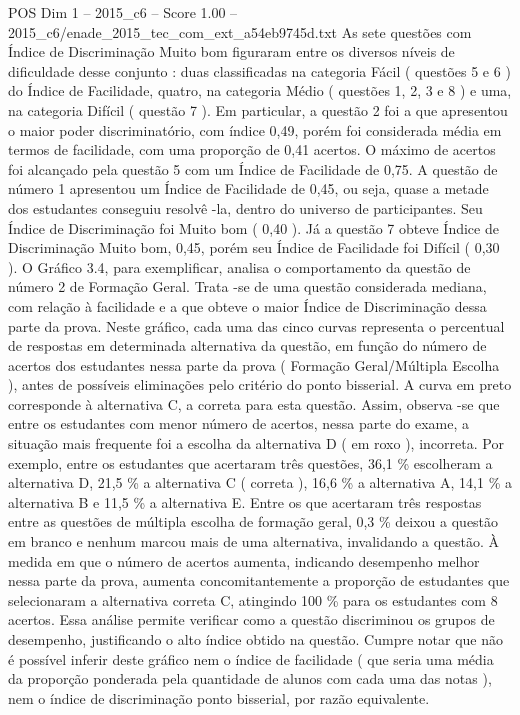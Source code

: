 \begin{textsample}{POS Dim 1 – 2015\_c6 – Score 1.00 – 2015\_c6/enade\_2015\_tec\_com\_ext\_a54eb9745d.txt}
As sete questões com Índice de Discriminação Muito bom figuraram entre os diversos níveis de dificuldade desse conjunto : duas classificadas na categoria Fácil ( questões 5 e 6 ) do Índice de Facilidade, quatro, na categoria Médio ( questões 1, 2, 3 e 8 ) e uma, na categoria Difícil ( questão 7 ).
Em particular, a questão 2 foi a que apresentou o maior poder discriminatório, com índice 0,49, porém foi considerada média em termos de facilidade, com uma proporção de 0,41 acertos.
O máximo de acertos foi alcançado pela questão 5 com um Índice de Facilidade de 0,75.
A questão de número 1 apresentou um Índice de Facilidade de 0,45, ou seja, quase a metade dos estudantes conseguiu resolvê -la, dentro do universo de participantes.
Seu Índice de Discriminação foi Muito bom ( 0,40 ).
Já a questão 7 obteve Índice de Discriminação Muito bom, 0,45, porém seu Índice de Facilidade foi Difícil ( 0,30 ).
O Gráfico 3.4, para exemplificar, analisa o comportamento da questão de número 2 de Formação Geral.
Trata -se de uma questão considerada mediana, com relação à facilidade e a que obteve o maior Índice de Discriminação dessa parte da prova.
Neste gráfico, cada uma das cinco curvas representa o percentual de respostas em determinada alternativa da questão, em função do número de acertos dos estudantes nessa parte da prova ( Formação Geral/Múltipla Escolha ), antes de possíveis eliminações pelo critério do ponto bisserial.
A curva em preto corresponde à alternativa C, a correta para esta questão.
Assim, observa -se que entre os estudantes com menor número de acertos, nessa parte do exame, a situação mais frequente foi a escolha da alternativa D ( em roxo ), incorreta.
Por exemplo, entre os estudantes que acertaram três questões, 36,1 \% escolheram a alternativa D, 21,5 \% a alternativa C ( correta ), 16,6 \% a alternativa A, 14,1 \% a alternativa B e 11,5 \% a alternativa E.
Entre os que acertaram três respostas entre as questões de múltipla escolha de formação geral, 0,3 \% deixou a questão em branco e nenhum marcou mais de uma alternativa, invalidando a questão.
À medida em que o número de acertos aumenta, indicando desempenho melhor nessa parte da prova, aumenta concomitantemente a proporção de estudantes que selecionaram a alternativa correta C, atingindo 100 \% para os estudantes com 8 acertos.
Essa análise permite verificar como a questão discriminou os grupos de desempenho, justificando o alto índice obtido na questão.
Cumpre notar que não é possível inferir deste gráfico nem o índice de facilidade ( que seria uma média da proporção ponderada pela quantidade de alunos com cada uma das notas ), nem o índice de discriminação ponto bisserial, por razão equivalente.

\end{textsample}
